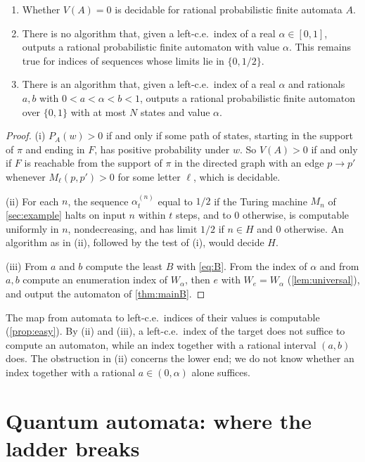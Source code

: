 \documentclass[11pt]{article}
\theoremstyle{plain}
\theoremstyle{definition}
\theoremstyle{remark}
\begin{document}
\begin{proposition}\label{prop:uniform}
\leavevmode
\begin{enumerate}[label=(\roman*)]
\item Whether $V(A)=0$ is decidable for rational probabilistic finite automata $A$.
\item There is no algorithm that, given a left-c.e.\ index of a real $\alpha\in[0,1]$, outputs a rational probabilistic finite automaton with value $\alpha$. This remains true for indices of sequences whose limits lie in $\{0,1/2\}$.
\item There is an algorithm that, given a left-c.e.\ index of a real $\alpha$ and rationals $a,b$ with $0<a<\alpha<b<1$, outputs a rational probabilistic finite automaton over $\{0,1\}$ with at most $N$ states and value $\alpha$.
\end{enumerate}
\end{proposition}

\begin{proof}
(i) $P_A(w)>0$ if and only if some path of states, starting in the support of $\pi$ and ending in $F$, has positive probability under $w$. So $V(A)>0$ if and only if $F$ is reachable from the support of $\pi$ in the directed graph with an edge $p\to p'$ whenever $M_\ell(p,p')>0$ for some letter $\ell$, which is decidable.

(ii) For each $n$, the sequence $\alpha^{(n)}_t$ equal to $1/2$ if the Turing machine $M_n$ of \cref{sec:example} halts on input $n$ within $t$ steps, and to $0$ otherwise, is computable uniformly in $n$, nondecreasing, and has limit $1/2$ if $n\in H$ and $0$ otherwise. An algorithm as in (ii), followed by the test of (i), would decide $H$.

(iii) From $a$ and $b$ compute the least $B$ with \eqref{eq:B}. From the index of $\alpha$ and from $a,b$ compute an enumeration index of $W_\alpha$, then $e$ with $W_e=W_\alpha$ (\cref{lem:universal}), and output the automaton of \cref{thm:mainB}.
\end{proof}

The map from automata to left-c.e.\ indices of their values is computable (\cref{prop:easy}). By (ii) and (iii), a left-c.e.\ index of the target does not suffice to compute an automaton, while an index together with a rational interval $(a,b)$ does. The obstruction in (ii) concerns the lower end; we do not know whether an index together with a rational $a\in(0,\alpha)$ alone suffices.

\section{Quantum automata: where the ladder breaks}\label{sec:quantum}
\end{document}
